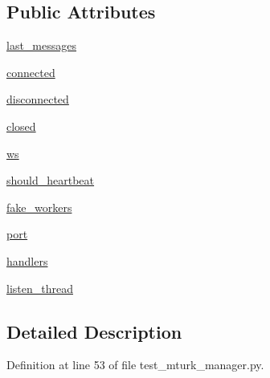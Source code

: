 \subsection*{Public Attributes}
\begin{DoxyCompactItemize}
\item 
\hyperlink{classparlai_1_1mturk_1_1core_1_1legacy__2018_1_1test_1_1test__mturk__manager_1_1MockSocket_a47bebe81a1fed70fa132871a2c44acb6}{last\+\_\+messages}
\item 
\hyperlink{classparlai_1_1mturk_1_1core_1_1legacy__2018_1_1test_1_1test__mturk__manager_1_1MockSocket_a05f030d7bd10230518aaf446f86729cf}{connected}
\item 
\hyperlink{classparlai_1_1mturk_1_1core_1_1legacy__2018_1_1test_1_1test__mturk__manager_1_1MockSocket_a9437bb73640837d4c20b0f87d814b0c1}{disconnected}
\item 
\hyperlink{classparlai_1_1mturk_1_1core_1_1legacy__2018_1_1test_1_1test__mturk__manager_1_1MockSocket_a25e65478ff858f9b05003be8aeb7d0ed}{closed}
\item 
\hyperlink{classparlai_1_1mturk_1_1core_1_1legacy__2018_1_1test_1_1test__mturk__manager_1_1MockSocket_abc580132a9356c8251cf3316292027a2}{ws}
\item 
\hyperlink{classparlai_1_1mturk_1_1core_1_1legacy__2018_1_1test_1_1test__mturk__manager_1_1MockSocket_a627dd28c6263a7b84a52249f6ce5eb49}{should\+\_\+heartbeat}
\item 
\hyperlink{classparlai_1_1mturk_1_1core_1_1legacy__2018_1_1test_1_1test__mturk__manager_1_1MockSocket_ac33a244832877adf2f9938d44d2243ef}{fake\+\_\+workers}
\item 
\hyperlink{classparlai_1_1mturk_1_1core_1_1legacy__2018_1_1test_1_1test__mturk__manager_1_1MockSocket_ad63cc3340435a1261bdf022bf6e8eaf4}{port}
\item 
\hyperlink{classparlai_1_1mturk_1_1core_1_1legacy__2018_1_1test_1_1test__mturk__manager_1_1MockSocket_abb4aecc1db223c93859cf97914a1658c}{handlers}
\item 
\hyperlink{classparlai_1_1mturk_1_1core_1_1legacy__2018_1_1test_1_1test__mturk__manager_1_1MockSocket_a12d8b491bbd95a494d57a302426f05a1}{listen\+\_\+thread}
\end{DoxyCompactItemize}


\subsection{Detailed Description}


Definition at line 53 of file test\+\_\+mturk\+\_\+manager.\+py.



